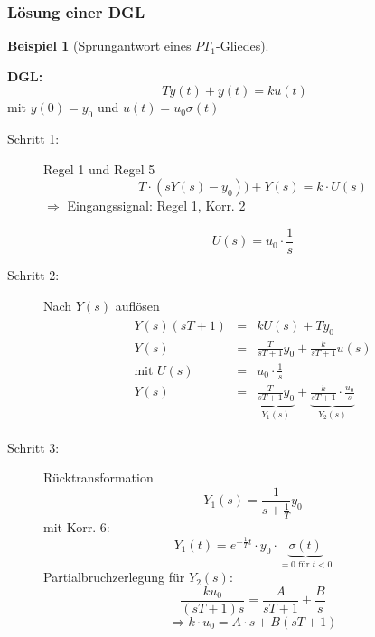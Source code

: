 \message{ !name(Mitschrieb_SysRegel.tex)}\documentclass[12pt,a4paper,ngerman]{scrartcl}
\newtheorem{bsp}{Beispiel}[section] %
\begin{document}
\subsubsection{Lösung einer DGL}
\begin{bsp}[Sprungantwort eines $PT_1$-Gliedes]
\end{bsp}
\textbf{DGL:}
\begin{equation*}
  T\dot{y}(t)+y(t)=ku(t)
\end{equation*}
mit $y(0)=y_0$ und $u(t)=u_0\sigma (t)$
\begin{description}
\item[Schritt 1: ] Regel 1 und Regel 5
  \begin{equation*}
    T\cdot (sY(s)-y_0))+Y(s)=k\cdot U(s)
  \end{equation*}
$\Rightarrow$ Eingangssignal: Regel 1, Korr. 2

\begin{equation*}
U(s)=u_0 \cdot \frac{1}{s}
\end{equation*}

\item[Schritt 2:] Nach $Y(s)$ auflösen
  \begin{align*}
    \begin{array}{llllll}
      Y(s)(sT+1)&=&kU(s)+Ty_0\\
      Y(s)&=& \frac{T}{sT+1}y_0+\frac{k}{sT+1}u(s)\\
      \text{mit } U(s)&=&u_0\cdot \frac{1}{s}\\
      Y(s)&=&\underbrace{\frac{T}{sT+1}y_0}_{Y_1(s)}+\underbrace{\frac{k}{sT+1}\cdot \frac{u_0}{s}}_{Y_2(s)}
    \end{array}
  \end{align*}
\item[Schritt 3:] Rücktransformation
  \begin{equation*}
    Y_1(s)=\frac{1}{s+\frac{1}{T}}y_0 
  \end{equation*}
mit Korr. 6:
\begin{equation*}
  Y_1(t)=e^{-\frac{1}{T}t}\cdot y_0 \cdot \underbrace{\sigma (t)}_{=0 \text{ für }t<0} 
\end{equation*}
Partialbruchzerlegung für $Y_2(s)$:
\begin{equation*}
\frac{k u_0}{(sT+1)s}=\frac{A}{sT+1}+\frac{B}{s}
\end{equation*}
\begin{equation*}
  \Rightarrow k\cdot u_0=A\cdot s+B(sT+1)
\end{equation*}
\end{description}
\end{document}
